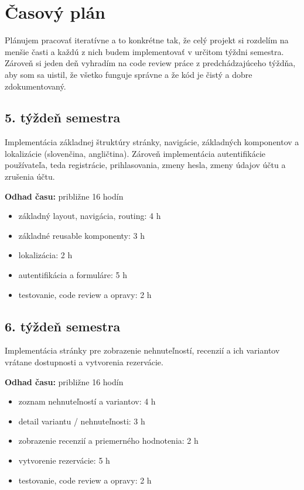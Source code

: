 \section{Časový plán}
Plánujem pracovať iteratívne a to konkrétne tak, že celý projekt si rozdelím na menšie časti a každú z nich budem implementovať v určitom týždni semestra.
Zároveň si jeden deň vyhradím na code review práce z predchádzajúceho týždňa, aby som sa uistil, že všetko funguje správne a že kód je čistý a dobre zdokumentovaný.

\subsection*{5. týždeň semestra}
Implementácia základnej štruktúry stránky, navigácie, základných komponentov a lokalizácie (slovenčina, angličtina). 
Zároveň implementácia autentifikácie používateľa, teda registrácie, prihlasovania, zmeny hesla, zmeny údajov účtu a zrušenia účtu.

\hspace{-1.5em}\textbf{Odhad času:} približne 16 hodín
\begin{itemize}[itemsep=2pt]
    \item základný layout, navigácia, routing: 4 h
    \item základné reusable komponenty: 3 h
    \item lokalizácia: 2 h
    \item autentifikácia a formuláre: 5 h
    \item testovanie, code review a opravy: 2 h 
\end{itemize}

\subsection*{6. týždeň semestra}
Implementácia stránky pre zobrazenie nehnuteľností, recenzií a ich variantov vrátane dostupnosti a vytvorenia rezervácie.

\hspace{-1.5em}\textbf{Odhad času:} približne 16 hodín
\begin{itemize}[itemsep=2pt]
    \item zoznam nehnuteľností a variantov: 4 h
    \item detail variantu / nehnuteľnosti: 3 h
    \item zobrazenie recenzií a priemerného hodnotenia: 2 h
    \item vytvorenie rezervácie: 5 h 
    \item testovanie, code review a opravy: 2 h 
\end{itemize}

